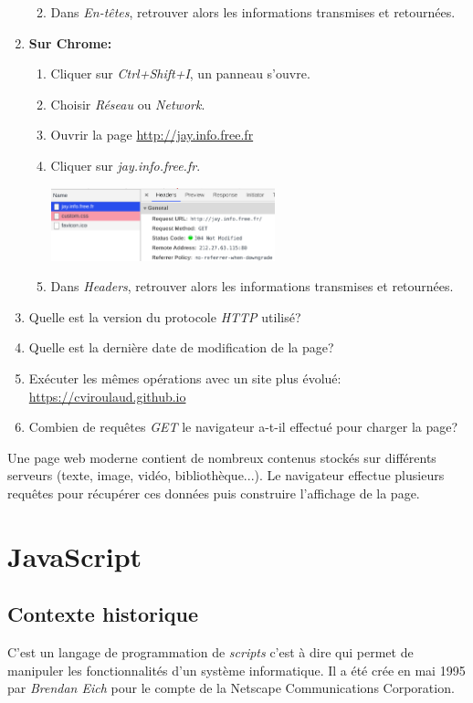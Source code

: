 \documentclass[a4paper,11pt]{article}
\begin{document}
\begin{Form}
\begin{activite}
\begin{enumerate}
\begin{enumerate}
\begin{center}
\end{center}
\item Dans \emph{En-têtes}, retrouver alors les informations transmises et retournées.
\end{enumerate}
\item \textbf{Sur Chrome:}
\begin{enumerate}
\item  Cliquer sur \emph{Ctrl+Shift+I}, un panneau s'ouvre.
\item Choisir \emph{Réseau} ou \emph{Network}.
\item Ouvrir la page \mbox{\url{http://jay.info.free.fr}}
\item Cliquer sur \emph{jay.info.free.fr}.
\begin{center}
\includegraphics[width=6.5cm]{ressources/requete-chrome.png}
\end{center}
\item Dans \emph{Headers}, retrouver alors les informations transmises et retournées.
\end{enumerate}
\item Quelle est la version du protocole \emph{HTTP} utilisé?
\item Quelle est la dernière date de modification de la page?
\item Exécuter les mêmes opérations avec un site plus évolué:  \mbox{\url{https://cviroulaud.github.io}}
\item Combien de requêtes \emph{GET} le navigateur a-t-il effectué pour charger la page?
\end{enumerate}
\begin{aretenir}[]
Une page web moderne contient de nombreux contenus stockés sur différents serveurs (texte, image, vidéo, bibliothèque...). Le navigateur effectue plusieurs requêtes pour récupérer ces données puis construire l'affichage de la page.
\end{aretenir}
\end{activite}
\section{JavaScript}
\subsection{Contexte historique}
C'est un langage de programmation de \emph{scripts} c'est à dire qui permet de manipuler les fonctionnalités d'un système informatique. Il a été crée en mai 1995 par \emph{Brendan Eich} pour le compte de la Netscape Communications Corporation.

\end{Form}
\end{document}
